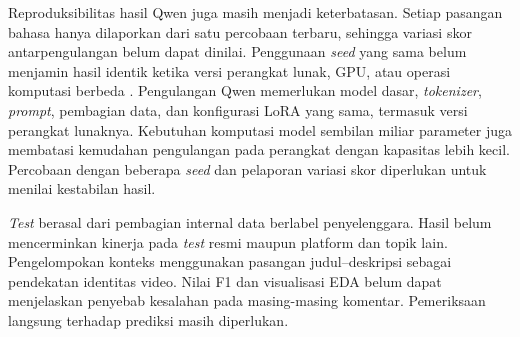 \documentclass[11pt]{article}
\begin{document}
Reproduksibilitas hasil Qwen juga masih menjadi keterbatasan. Setiap pasangan bahasa hanya dilaporkan dari satu percobaan terbaru, sehingga variasi skor antarpengulangan belum dapat dinilai. Penggunaan \textit{seed} yang sama belum menjamin hasil identik ketika versi perangkat lunak, GPU, atau operasi komputasi berbeda \citep{pytorch-reproducibility}. Pengulangan Qwen memerlukan model dasar, \textit{tokenizer}, \textit{prompt}, pembagian data, dan konfigurasi LoRA yang sama, termasuk versi perangkat lunaknya. Kebutuhan komputasi model sembilan miliar parameter juga membatasi kemudahan pengulangan pada perangkat dengan kapasitas lebih kecil. Percobaan dengan beberapa \textit{seed} dan pelaporan variasi skor diperlukan untuk menilai kestabilan hasil.

\textit{Test} berasal dari pembagian internal data berlabel penyelenggara. Hasil belum mencerminkan kinerja pada \textit{test} resmi maupun platform dan topik lain. Pengelompokan konteks menggunakan pasangan judul--deskripsi sebagai pendekatan identitas video. Nilai F1 dan visualisasi EDA belum dapat menjelaskan penyebab kesalahan pada masing-masing komentar. Pemeriksaan langsung terhadap prediksi masih diperlukan.


\end{document}
